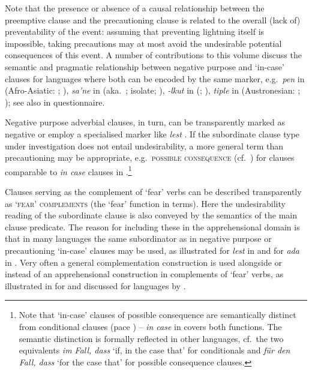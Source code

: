 \documentclass[output=paper,colorlinks,citecolor=brown]{langscibook}
\begin{document}
Note that the presence or absence of a causal relationship between the preemptive clause and the precautioning clause is related to the overall (lack of) preventability of the event: assuming that preventing lightning itself is impossible, taking precautions may at most avoid the undesirable potential consequences of this event. A number of contributions to this volume discuss the semantic and pragmatic relationship between negative purpose and `in-case' clauses for languages where both can be encoded by the same marker, e.g.\ \textit{pen} in  (Afro-Asiatic: ; \citealt{chapters/francez}), \textit{sa'ne} in  (aka.\ ; isolate; \citealt{chapters/dabkowski-anderbois}), \textit{-lkut} in  (; \citealt{chapters/daniel}), \textit{tiple} in  (Austronesian: ; \citealt{chapters/francois}); see also  in  questionnaire.


Negative purpose adverbial clauses, in turn, can be transparently marked as negative or employ a specialised marker like  \textit{lest} \citep[130]{schmidtkebode2009}. If the subordinate clause type under investigation does not entail undesirability, a more general term than precautioning may be appropriate, e.g.\ \textsc{possible consequence} (cf.\ \cite[2]{dixon2009}) for clauses comparable to \textit{in case} clauses in  .\footnote{Note that `in-case' clauses of possible consequence are semantically distinct from conditional clauses (pace \cite[136]{schmidtkebode2009}) -- \textit{in case} in  covers both functions. The semantic distinction is formally reflected in other languages, cf.\ the two  equivalents \textit{im Fall, dass} `if, in the case that' for conditionals and \textit{für den Fall, dass} `for the case that' for possible consequence clauses.}

Clauses serving as the complement of `fear' verbs can be described transparently as \textsc{`fear' complements} (the `fear' function in  terms). Here the undesirability reading of the subordinate clause is also conveyed by the semantics of the main clause predicate. The reason for including these in the apprehensional domain is that in many languages the same subordinator as in negative purpose or precautioning `in-case' clauses may be used, as illustrated for  \textit{lest} in  and for  \textit{ada} in . Very often a general complementation construction is used alongside or instead of an apprehensional construction in complements of `fear' verbs, as illustrated in  for  and discussed for  languages by \citet{chapters/browne}. 
\end{document}
